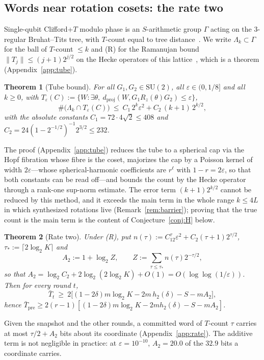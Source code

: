 \documentclass[aps,prx,twocolumn,superscriptaddress,nofootinbib,longbibliography]{revtex4-2}
\theoremstyle{plain}
\newtheorem{theorem}{Theorem}
\theoremstyle{definition}
\theoremstyle{remark}
\newcommand{\dproj}{d_{\mathrm{proj}}}
\newcommand{\Tpre}{T_{\mathrm{pre}}}
\newcommand{\SU}{\mathrm{SU}(2)}
\begin{document}
\subsection{Words near rotation cosets: the rate two}\label{sec:tube}

Single-qubit Clifford+$T$ modulo phase is an $S$-arithmetic group $\Gamma$ acting on the $3$-regular Bruhat--Tits tree, with $T$-count equal to tree distance~\cite{KMM13,PS18}. We write $\Lambda_k\subset\Gamma$ for the ball of $T$-count $\le k$ and (R) for the Ramanujan bound $\|T_j\|\le(j+1)2^{j/2}$ on the Hecke operators of this lattice~\cite{LPS,PS18}, which is a theorem (Appendix~\ref{app:tube}).


\begin{theorem}[Tube bound]\label{thm:tube}
For all $G_1,G_2\in\SU$, all $\varepsilon\in(0,1/8]$ and all $k\ge0$, with
$T_\varepsilon(C):=\{W:\exists\theta,\ \dproj(W,G_1R_z(\theta)G_2)\le\varepsilon\}$,
\begin{equation}\label{eq:tube}
\#\big(\Lambda_k\cap T_\varepsilon(C)\big)\ \le\ C_1\,2^k\varepsilon^2+C_2\,(k+1)\,2^{k/2},
\end{equation}
with the absolute constants $C_1=72\cdot4\sqrt2\le408$ and $C_2=24(1-2^{-1/2})^{-1}2^{3/2}\le232$.
\end{theorem}
The proof (Appendix~\ref{app:tube}) reduces the tube to a spherical cap via the Hopf fibration whose fibre is the coset, majorizes the cap by a Poisson kernel of width $2\varepsilon$---whose spherical-harmonic coefficients are $r^\ell$ with $1-r=2\varepsilon$, so that both constants can be read off---and bounds the count by the Hecke operator through a rank-one sup-norm estimate.
The error term $(k+1)2^{k/2}$ cannot be reduced by this method, and it exceeds the main term in the whole range $k\le4L$ in which synthesized rotations live (Remark~\ref{rem:barrier}); proving that the true count is the main term is the content of Conjecture~\ref{conj:H} below.


\begin{theorem}[Rate two]\label{thm:rate2}
Under (R), put $n(\tau):=C_12^\tau\varepsilon^2+C_2(\tau+1)2^{\tau/2}$, $\tau_*:=\lceil2\log_2K\rceil$ and
\begin{equation}\label{eq:A2}
A_2:=1+\log_2 Z,\qquad Z:=\sum_{\tau\le\tau_*}n(\tau)2^{-\tau/2},
\end{equation}
so that $A_2=\log_2C_2+2\log_2(2\log_2K)+O(1)=O(\log\log(1/\varepsilon))$. Then for every round $t$,
\begin{equation}
\bar T_t\ \ge\ 2\big[(1-2\delta)m\log_2K-2m\,h_2(\delta)-S-mA_2\big],
\end{equation}
hence $\bar\Tpre\ge2(r-1)[(1-2\delta)m\log_2K-2mh_2(\delta)-S-mA_2]$.
\end{theorem}
Given the snapshot and the other rounds, a committed word of $T$-count $\tau$ carries at most $\tau/2+A_2$ bits about its coordinate (Appendix~\ref{app:rate}). The additive term is not negligible in practice: at $\varepsilon=10^{-10}$, $A_2=20.0$ of the $32.9$ bits a coordinate carries.
\end{document}
